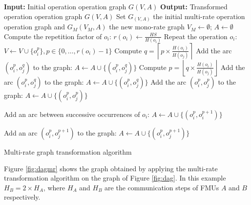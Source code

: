 \begin{algorithm}[!htp]
		\textbf{Input:} Initial operation operation graph $G(V,A)$\; 
		\textbf{Output:} Transformed operation operation graph $G(V,A)$\;
		Set $G_(V,A)$ the initial multi-rate operation operation graph and $G_M(V_M,A)$ the new mono-rate graph\; 
		$V_M \leftarrow \emptyset$; $A \leftarrow \emptyset$\;
		{
			Compute the repetition factor of $o_i$: $r(o_i) \leftarrow \frac{HS}{H(o_i)}$\;
			Repeat the operation $o_i$: $V \leftarrow V \cup \{o_i^p\}, p \in \{0, \dots,r(o_i)-1\}$\;
		}
		{
			{
					{
						Compute $q = \left \lceil{p \times \frac{H(o_i)}{H(o_j)}}\right \rceil$\;
						Add the arc $(o_i^p,o_j^q)$ to the graph: $A \leftarrow A \cup \{(o_i^p,o_j^q)\}$\;
					}
			}
			{
					{
						Compute $p = \left \lfloor{q \times \frac{H(o_i)}{H(o_j)}}\right \rfloor$\;
						Add the arc $(o_i^p,o_j^q)$ to the graph: $A \leftarrow A \cup \{(o_i^p,o_j^q)\}$\;
					}
			}
			\Else
			{
					{
					  Add the arc $(o_i^p,o_j^p)$ to the graph: $A \leftarrow A \cup \{(o_i^p,o_j^p)\}$\;
					}
			}
		}
		{
			{
				 Add an arc between successive occurrences of $o_i$: $A \leftarrow A \cup \{(o_i^p,o_i^{p+1})\}$\;
			}
			
		}
		{
					{
						{
							Add an arc $(o_i^p,o_j^{p+1})$ to the graph: $A \leftarrow A \cup \{(o_i^p,o_j^{p+1})\}$\;
						}
					
					}
		}
	\caption{Multi-rate graph transformation algorithm}
	\label{algo:mr}
\end{algorithm}

Figure \ref{fig:dagmr} shows the graph obtained by applying the multi-rate transformation algorithm on the graph of Figure \ref{fig:dag}. In this example $H_B = 2 \times H_A$, where $H_A$ and $H_B$ are the communication steps of FMUs $A$ and $B$ respectively.

